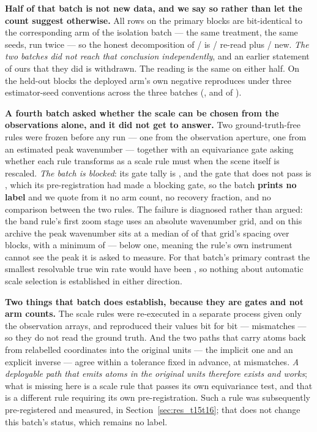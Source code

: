 \documentclass[review]{elsarticle}
\begin{document}
\textbf{Half of that batch is not new data, and we say so rather than let the count
suggest otherwise.} All \TThirteenReuseN{} rows on the primary blocks are
bit-identical to the corresponding arm of the isolation batch --- the same treatment,
the same seeds, run twice --- so the honest decomposition of
\TThirteenWin{}/\TThirteenN{} is \TThirteenReuseWin{}/\TThirteenReuseN{} re-read plus
\TThirteenFreshWin{}/\TThirteenFreshN{} new. \emph{The two batches did not reach that
conclusion independently}, and an earlier statement of ours that they did is
withdrawn. The reading is the same on either half. On the \TThirteenFreshN{} held-out
blocks the deployed arm's own negative reproduces under three estimator-seed
conventions across the three batches (\TTwelveShipHeldWin{},
\TThirteenShipFreshWin{} and \TFourteenShipHeldWin{} of \TThirteenFreshN{}).

\textbf{A fourth batch asked whether the scale can be chosen from the observations
alone, and it did not get to answer.} Two ground-truth-free rules were frozen before
any run --- one from the observation aperture, one from an estimated peak wavenumber
--- together with an equivariance gate asking whether each rule transforms as a scale
rule must when the scene itself is rescaled. \emph{The batch is blocked}:
its gate tally is \TFourteenGates{}, and the gate that does not pass is
\TFourteenBlocked{},
which its pre-registration had made a blocking gate, so the batch \textbf{prints no
label} and we quote from it no arm count, no recovery fraction, and no comparison
between the two rules. The failure is diagnosed rather than argued: the band rule's
first zoom stage uses an absolute wavenumber grid, and on this archive the peak
wavenumber sits at a median of \TFourteenBandMed{} of that grid's spacing over
\TFourteenBandN{} blocks, with a minimum of \TFourteenBandMin{} --- below one, meaning
the rule's own instrument cannot see the peak it is asked to measure. For that
batch's primary contrast the smallest resolvable true win rate would have been
\TFourteenMDE{}, so nothing about automatic scale selection is established in either
direction.

\textbf{Two things that batch does establish, because they are gates and not arm
counts.} The scale rules were re-executed in a separate process given only the
observation arrays, and reproduced their values bit for bit --- \TFourteenBlind{}
mismatches --- so they do not read the ground truth. And the two paths that carry
atoms back from relabelled coordinates into the original units --- the implicit one
and an explicit inverse --- agree within a tolerance fixed in advance, at
\TFourteenInvert{} mismatches. \emph{A deployable path that emits atoms in the original units therefore
exists and works}; what is missing here is a scale rule that passes its own
equivariance test, and that is a different rule requiring its own pre-registration.
Such a rule was subsequently pre-registered and measured, in
Section~\ref{sec:res_t15t16}; that does not change this batch's status, which
remains no label.
\end{document}

